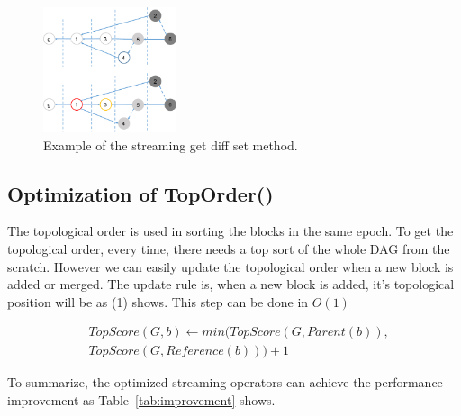\begin{figure}[!ht]
\begin{center}
\includegraphics[width=0.35\textwidth]{figures/get_diff.pdf}
    \caption{
        Example of the streaming get diff set method.
     }
\label{get_diff}
\end{center}
\end{figure}

\subsection{Optimization of TopOrder()}
The topological order is used in sorting the blocks in the same epoch.
To get the topological order, every time, there needs a top sort of the whole DAG from the scratch.
However we can easily update the topological order when a new block is added or merged.
The update rule is, when a new block is added, it's topological position will be as (1) shows. This step can be done in $O(1)$ 

\begin{equation}
    \begin{flalign*}
        & TopScore(G, b) \gets min(TopScore(G, Parent(b)), \\
        & TopScore(G, Reference(b))) + 1
    \end{flalign*}
\end{equation}


To summarize, the optimized streaming operators can achieve the performance improvement as Table~\ref{tab:improvement} shows. 

\begin{table}[]
\caption {Analysis of Graph properties calculation} \label{tab:improvement}
\begin{center}
\end{center}
\end{table}

